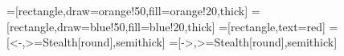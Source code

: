 \usepackage{tikz}


\usetikzlibrary{spy} %
\usetikzlibrary {arrows.meta}
\usetikzlibrary {positioning}
\usetikzlibrary {shapes.geometric}
\usetikzlibrary {decorations.pathmorphing}


=[rectangle,draw=orange!50,fill=orange!20,thick]
=[rectangle,draw=blue!50,fill=blue!20,thick]
=[rectangle,text=red]
=[<-,>={Stealth[round]},semithick]
=[->,>={Stealth[round]},semithick]